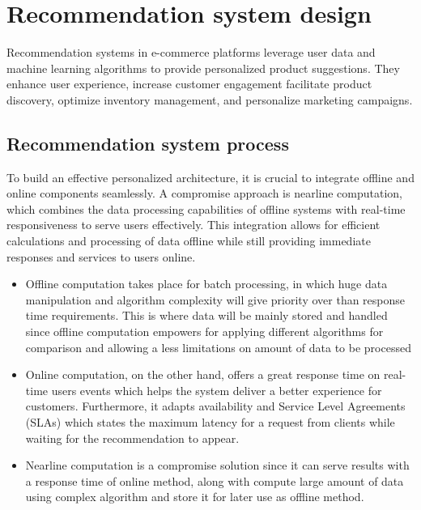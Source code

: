 \section{Recommendation system design}

\noindent Recommendation systems in e-commerce platforms leverage user data and machine learning algorithms to provide personalized product suggestions. They enhance user experience, increase customer engagement facilitate product discovery, optimize inventory management, and personalize marketing campaigns.

\subsection{Recommendation system process}

\noindent To build an effective personalized architecture, it is crucial to integrate offline and online components seamlessly. A compromise approach is nearline computation, which combines the data processing capabilities of offline systems with real-time responsiveness to serve users effectively. This integration allows for efficient calculations and processing of data offline while still providing immediate responses and services to users online.

\begin{itemize}
    \item Offline computation takes place for batch processing, in which huge data manipulation and algorithm complexity will give priority over than response time requirements. This is where data will be mainly stored and handled since offline computation empowers for applying different algorithms for comparison and allowing a less limitations on amount of data to be processed
    \item Online computation, on the other hand, offers a great response time on real-time users events which helps the system deliver a better experience for customers. Furthermore, it adapts availability and Service Level Agreements (SLAs) which states the maximum latency for a request from clients while waiting for the recommendation to appear. 
     \item Nearline computation is a compromise solution since it can serve results with a response time of online method, along with compute large amount of data using complex algorithm and store it for later use as offline method. 
\end{itemize}

